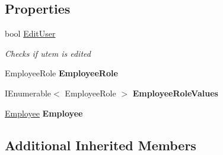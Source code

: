 \subsection*{Properties}
\begin{DoxyCompactItemize}
\item 
bool \hyperlink{class_baudi_1_1_client_1_1_view_models_1_1_edit_window_view_models_1_1_employee_edit_window_view_model_a9eab1b3c166b70aaf85246cb46b64d2e}{Edit\+User}
\begin{DoxyCompactList}\small\item\em Checks if utem is edited \end{DoxyCompactList}\item 
\hypertarget{class_baudi_1_1_client_1_1_view_models_1_1_edit_window_view_models_1_1_employee_edit_window_view_model_a7439316a9aca78072501760b101df26c}{}Employee\+Role {\bfseries Employee\+Role}\label{class_baudi_1_1_client_1_1_view_models_1_1_edit_window_view_models_1_1_employee_edit_window_view_model_a7439316a9aca78072501760b101df26c}

\item 
\hypertarget{class_baudi_1_1_client_1_1_view_models_1_1_edit_window_view_models_1_1_employee_edit_window_view_model_adfec5bbe2e67c9115b4982dde737701a}{}I\+Enumerable$<$ Employee\+Role $>$ {\bfseries Employee\+Role\+Values}\label{class_baudi_1_1_client_1_1_view_models_1_1_edit_window_view_models_1_1_employee_edit_window_view_model_adfec5bbe2e67c9115b4982dde737701a}

\item 
\hypertarget{class_baudi_1_1_client_1_1_view_models_1_1_edit_window_view_models_1_1_employee_edit_window_view_model_aca74c93b5c8af78606eab4083376b993}{}\hyperlink{class_baudi_1_1_d_a_l_1_1_models_1_1_employee}{Employee} {\bfseries Employee}\label{class_baudi_1_1_client_1_1_view_models_1_1_edit_window_view_models_1_1_employee_edit_window_view_model_aca74c93b5c8af78606eab4083376b993}

\end{DoxyCompactItemize}
\subsection*{Additional Inherited Members}


